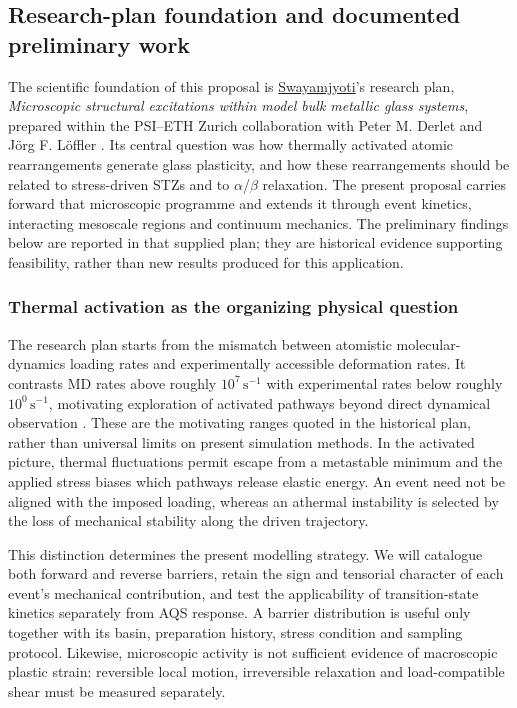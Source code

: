 \documentclass[11pt,a4paper]{article}
\begin{document}
\subsection{Research-plan foundation and documented preliminary work}
The scientific foundation of this proposal is \underline{Swayamjyoti}'s research plan, \emph{Microscopic structural excitations within model bulk metallic glass systems}, prepared within the PSI--ETH Zurich collaboration with Peter M. Derlet and J\"org F. L\"offler \cite{swayplan}. Its central question was how thermally activated atomic rearrangements generate glass plasticity, and how these rearrangements should be related to stress-driven STZs and to $\alpha$/$\beta$ relaxation. The present proposal carries forward that microscopic programme and extends it through event kinetics, interacting mesoscale regions and continuum mechanics. The preliminary findings below are reported in that supplied plan; they are historical evidence supporting feasibility, rather than new results produced for this application.

\subsubsection{Thermal activation as the organizing physical question}
The research plan starts from the mismatch between atomistic molecular-dynamics loading rates and experimentally accessible deformation rates. It contrasts MD rates above roughly $10^7\,\mathrm{s}^{-1}$ with experimental rates below roughly $10^0\,\mathrm{s}^{-1}$, motivating exploration of activated pathways beyond direct dynamical observation \cite{swayplan}. These are the motivating ranges quoted in the historical plan, rather than universal limits on present simulation methods. In the activated picture, thermal fluctuations permit escape from a metastable minimum and the applied stress biases which pathways release elastic energy. An event need not be aligned with the imposed loading, whereas an athermal instability is selected by the loss of mechanical stability along the driven trajectory.

This distinction determines the present modelling strategy. We will catalogue both forward and reverse barriers, retain the sign and tensorial character of each event's mechanical contribution, and test the applicability of transition-state kinetics separately from AQS response. A barrier distribution is useful only together with its basin, preparation history, stress condition and sampling protocol. Likewise, microscopic activity is not sufficient evidence of macroscopic plastic strain: reversible local motion, irreversible relaxation and load-compatible shear must be measured separately.
\end{document}

